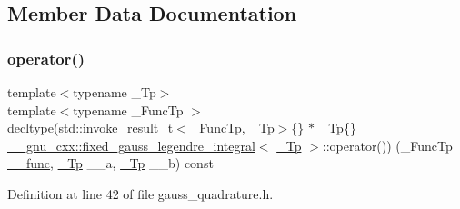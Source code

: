 \subsection{Member Data Documentation}
\mbox{\label{struct____gnu__cxx_1_1fixed__gauss__legendre__integral_aa6a0f40e1c8dba2864c88401fea3067d}} 
\subsubsection{\texorpdfstring{operator()}{operator()}}
{\footnotesize\ttfamily template$<$typename \+\_\+\+Tp$>$ \\
template$<$typename \+\_\+\+Func\+Tp $>$ \\
decltype(std\+::invoke\+\_\+result\+\_\+t$<$\+\_\+\+Func\+Tp, \hyperlink{namespace____gnu__cxx_a3b19a9c800ca194374ef9172290f7d79}{\+\_\+\+Tp}$>$\{\} $\ast$ \hyperlink{namespace____gnu__cxx_a3b19a9c800ca194374ef9172290f7d79}{\+\_\+\+Tp}\{\} \hyperlink{struct____gnu__cxx_1_1fixed__gauss__legendre__integral}{\+\_\+\+\_\+gnu\+\_\+cxx\+::fixed\+\_\+gauss\+\_\+legendre\+\_\+integral}$<$ \hyperlink{namespace____gnu__cxx_a3b19a9c800ca194374ef9172290f7d79}{\+\_\+\+Tp} $>$\+::operator()) (\+\_\+\+Func\+Tp \hyperlink{namespace____gnu__cxx_af2b2f0c7a2ae72b922b1afefae5a65b2}{\+\_\+\+\_\+func}, \hyperlink{namespace____gnu__cxx_a3b19a9c800ca194374ef9172290f7d79}{\+\_\+\+Tp} \+\_\+\+\_\+a, \hyperlink{namespace____gnu__cxx_a3b19a9c800ca194374ef9172290f7d79}{\+\_\+\+Tp} \+\_\+\+\_\+b) const}



Definition at line 42 of file gauss\+\_\+quadrature.\+h.

\mbox{\label{struct____gnu__cxx_1_1fixed__gauss__legendre__integral_a51724253e7545ed73de4be77aabf951a}} 
